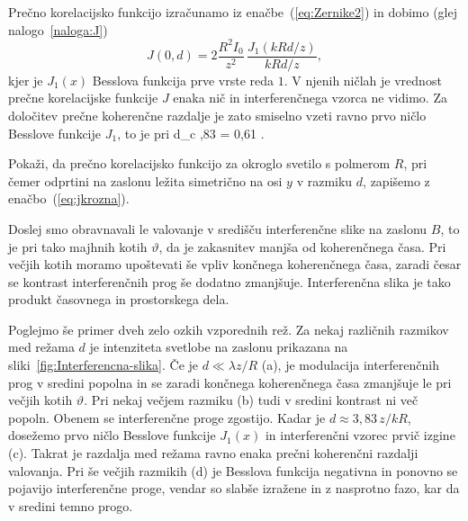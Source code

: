 Prečno korelacijsko funkcijo izračunamo iz enačbe~(\ref{eq:Zernike2}) in dobimo 
(glej nalogo~\ref{naloga:J})
\begin{equation}
J(0,d)=2\frac{R^{2}I_{0}}{z^{2}}\,\frac{J_{1}(kRd/z)}{kRd/z},
\label{eq:jkrozna}
\end{equation}
kjer je $J_{1}(x)$ Besslova funkcija prve vrste reda $1$. V njenih ničlah
je vrednost prečne korelacijske funkcije $J$ enaka nič in interferenčnega vzorca ne vidimo. 
Za določitev prečne koherenčne razdalje je zato smiselno vzeti ravno prvo ničlo Besslove funkcije
$J_1$, to je pri
\beq
\label{eq:okroglo_svetilo}
d_{c} ,83  = 0,61 .
\eeq
\begin{naloga}
\label{naloga:J}
Pokaži, da prečno korelacijsko funkcijo za okroglo svetilo s polmerom $R$, pri čemer
odprtini na zaslonu ležita simetrično na osi $y$ v razmiku $d$, zapišemo z enačbo~(\ref{eq:jkrozna}). 
\end{naloga}

Doslej smo obravnavali le valovanje v središču interferenčne slike na
zaslonu $B$, to je pri tako majhnih kotih $\vartheta$, da je zakasnitev
manjša od koherenčnega časa. Pri večjih kotih moramo upoštevati še
vpliv končnega koherenčnega časa, zaradi česar se kontrast interferenčnih
prog še dodatno zmanjšuje. Interferenčna slika je 
tako produkt časovnega in prostorskega dela. 

Poglejmo še primer dveh zelo ozkih vzporednih rež. 
Za nekaj različnih razmikov med režama $d$ je intenziteta
svetlobe na zaslonu prikazana na sliki~\ref{fig:Interferencna-slika}.
Če je $d\ll\lambda z/R$ (a), je modulacija interferenčnih prog v sredini
popolna in se zaradi končnega koherenčnega časa zmanjšuje le pri večjih
kotih $\vartheta$. Pri nekaj večjem razmiku (b) tudi v sredini kontrast
ni več popoln. Obenem se interferenčne proge zgostijo. Kadar je $d\approx 3,83\,z/kR$,
dosežemo prvo ničlo Besslove funkcije $J_{1}(x)$ in interferenčni vzorec
prvič izgine (c). Takrat je razdalja med režama ravno enaka prečni
koherenčni razdalji valovanja. Pri še večjih razmikih (d) 
je Besslova funkcija negativna in ponovno se pojavijo interferenčne proge, 
vendar so slabše izražene in z nasprotno fazo, kar da v sredini temno progo. 

